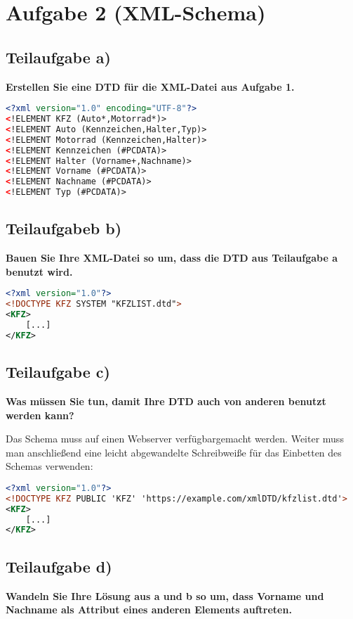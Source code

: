 \section{Aufgabe 2 (XML-Schema)}

\subsection{Teilaufgabe a)}
\textbf{Erstellen Sie eine DTD für die XML-Datei aus Aufgabe 1.}

\begin{lstlisting}[language=xml, caption={XML-Datei},
label={lst:xml}]
<?xml version="1.0" encoding="UTF-8"?>
<!ELEMENT KFZ (Auto*,Motorrad*)>
<!ELEMENT Auto (Kennzeichen,Halter,Typ)>
<!ELEMENT Motorrad (Kennzeichen,Halter)>
<!ELEMENT Kennzeichen (#PCDATA)>
<!ELEMENT Halter (Vorname+,Nachname)>
<!ELEMENT Vorname (#PCDATA)>
<!ELEMENT Nachname (#PCDATA)>
<!ELEMENT Typ (#PCDATA)>
\end{lstlisting}

\subsection{Teilaufgabeb b)}
\textbf{Bauen Sie Ihre XML-Datei so um, dass die DTD aus Teilaufgabe a benutzt
wird.}
\begin{lstlisting}[language=xml, caption={XML-Datei},
label={lst:xml}]
<?xml version="1.0"?>
<!DOCTYPE KFZ SYSTEM "KFZLIST.dtd">
<KFZ>
	[...] 	
</KFZ>
\end{lstlisting}

\subsection{Teilaufgabe c)}
\textbf{Was müssen Sie tun, damit Ihre DTD auch von anderen benutzt werden
kann?}

Das Schema muss auf einen Webserver verfügbargemacht werden. Weiter muss man
anschließend eine leicht abgewandelte Schreibweiße für das Einbetten des Schemas
verwenden:
\begin{lstlisting}[language=xml, caption={XML-Datei},
label={lst:xml}]
<?xml version="1.0"?>
<!DOCTYPE KFZ PUBLIC 'KFZ' 'https://example.com/xmlDTD/kfzlist.dtd'>
<KFZ>
	[...]
</KFZ>
\end{lstlisting}

\subsection{Teilaufgabe d)}
\textbf{Wandeln Sie Ihre Lösung aus a und b so um, dass Vorname und Nachname als Attribut
eines anderen Elements auftreten.}

